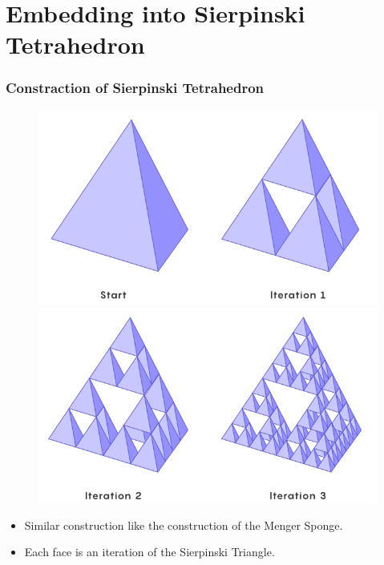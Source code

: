\section{Embedding into Sierpinski Tetrahedron}

\begin{frame}
	\frametitle{Constraction of Sierpinski Tetrahedron\cite{Quanta}}
	\begin{figure}[!htb]
		\begin{minipage}{0.5\textwidth}
			\centering
			\includegraphics[width=1.0\linewidth]{images/SierpinskiTet}
		\end{minipage}\hfill
		\begin{minipage}{0.5\textwidth}
			\centering
			\includegraphics[width=1.0\linewidth]{images/SierpinskiTet2}
		\end{minipage}
	\end{figure}
	\begin{itemize}
		\item Similar construction like the construction of the Menger Sponge.
		\item Each face is an iteration of the Sierpinski Triangle.
	\end{itemize}
\end{frame}

